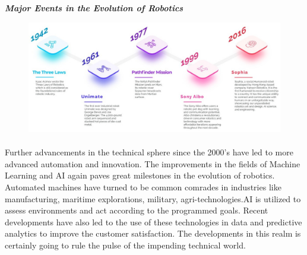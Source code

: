 \newpage
\begin{fullwidth}
    \centering
    \textbf{\textit{Major Events in the Evolution of Robotics}}
    \vspace{0.5cm}
     \begin{figure}[h!]
        \centering
        \includegraphics[width=\textwidth]{Images/Intro_robotics/timeline.jpeg}
    \end{figure}
\end{fullwidth}

\paragraph{ } Further advancements in the technical sphere since the 2000's have led to more advanced automation and innovation. The improvements in the fields of Machine Learning and \ac{AI} again paves great milestones in the evolution of robotics. Automated machines have turned to be common comrades in industries like manufacturing, maritime explorations, military, agri-technologies.\ac{AI} is utilized to assess environments and act according to the programmed goals.
Recent developments have also led to the use of these technologies in data and predictive analytics to improve the customer satisfaction. The developments in this realm is certainly going to rule the pulse of the impending technical world.


